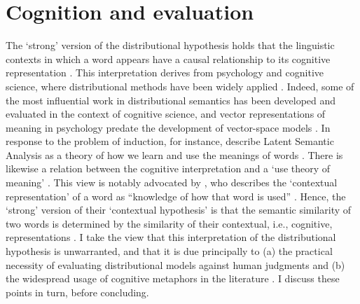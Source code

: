 \section{Cognition and evaluation}
\label{cognition-and-evaluation}

The `strong' version of the distributional hypothesis holds that the linguistic
contexts in which a word appears have a causal relationship to its cognitive
representation \parencites[16-18]{Lenci2008}[18-19]{Lenci2023}.
This interpretation derives from psychology and cognitive science, where distributional
methods have been widely applied
\parencites[e.g.][16]{Lenci2008}[15-16]{Lenci2023}{Landauer2011}.
Indeed, some of the most influential work in distributional semantics has been
developed and evaluated in the context of cognitive science, and vector representations
of meaning in psychology predate the development of vector-space models
.
In response to the problem of induction, for instance, \textcites{Landauer1997}
describe Latent Semantic Analysis as a theory of how we learn and use the meanings of
words \parencite[cf.][3-34]{Landauer2011}.
There is likewise a relation between the cognitive interpretation and a `use theory of
meaning' \parencites[22-23]{Lenci2023}.
This view is notably advocated by \textcites{Miller1991}, who describes the `contextual
representation' of a word as ``knowledge of how that word is used''
\parencites*[4]{Miller1991}.
Hence, the `strong' version of their `contextual hypothesis' is that the semantic
similarity of two words is determined by the similarity of their contextual, i.e.,
cognitive, representations \parencites*[8]{Miller1991}.
I take the view that this interpretation of the distributional hypothesis is
unwarranted, and that it is due principally to (a) the practical necessity of
evaluating distributional models against human judgments and (b) the widespread usage
of cognitive metaphors in the literature \parencites[569-570]{Gastaldi2021a}.
I discuss these points in turn, before concluding.

